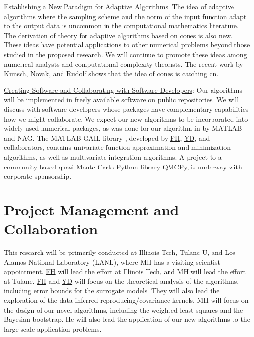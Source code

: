 \documentclass[11pt]{NSFamsart}
\newcommand{\Upara}[1]{\noindent\underline{\upshape #1}:}
\newcommand{\FH}{\hyperlink{FHlink}{FH}\xspace}
\newcommand{\YD}{\hyperlink{YDlink}{YD}\xspace}
\newcommand{\GAIL}{GAIL\xspace}
\newcommand{\NAG}{NAG\xspace}
\newcommand{\MATLAB}{MATLAB\xspace}
\begin{document}
\Upara{Establishing a New Paradigm for Adaptive Algorithms} 
The idea of adaptive algorithms where the sampling scheme and the norm of the input function adapt to the output data is uncommon in the computational mathematics literature. The derivation of theory for adaptive algorithms based on cones is also new. These ideas have potential applications to other numerical problems beyond those studied in the proposed research. We will continue to promote these ideas among numerical analysts and computational complexity theorists. The recent work by Kunsch, Novak, and Rudolf \cite{KunEtal19a} shows that the idea of cones is catching on.

\begin{sloppypar}\Upara{Creating Software and Collaborating with Software Developers}
Our algorithms will be implemented in freely available software on public repositories. We will discuss with software developers whose packages have complementary capabilities how we might collaborate. We expect our new algorithms to be incorporated into widely used numerical packages, as was done for our algorithm in \cite{HonHic00a} by \MATLAB and \NAG. The \MATLAB \GAIL library \citep{ChoEtal19a}, developed by \FH, \YD, and collaborators, contains univariate function approximation and minimization algorithms, as well as multivariate integration algorithms. A project to a community-based quasi-Monte Carlo Python library QMCPy, is underway with corporate sponsorship. \end{sloppypar}

\section{Project Management and Collaboration}
This research will be primarily conducted at Illinois Tech, Tulane U, and Los Alamos National Laboratory (LANL), where MH has a visiting scientist appointment. \FH will lead the effort at Illinois Tech, and MH will lead the effort at Tulane. \FH and \YD will focus on the theoretical analysis of the algorithms, including error bounds for the surrogate models. They will also lead the exploration of the data-inferred reproducing/covariance kernels. MH will focus on the design of our novel algorithms, including the weighted least squares and the Bayesian bootstrap. He will also lead the application of our new algorithms to the large-scale application problems. 
\end{document}
